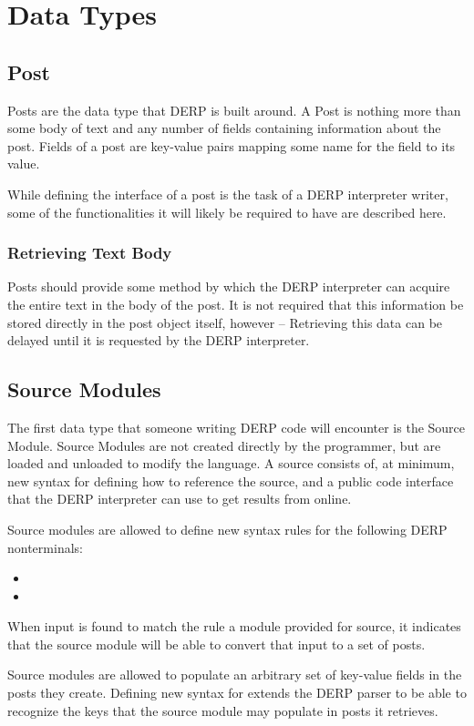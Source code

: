 \section{Data Types}

\subsection{Post}
Posts are the data type that DERP is built around. A Post is nothing more than some body
of text and any number of fields containing information about the post. Fields of a post
are key-value pairs mapping some name for the field to its value.

While defining the interface of a post is the task of a DERP interpreter writer, some of
the functionalities it will likely be required to have are described here.

\subsubsection{Retrieving Text Body}
Posts should provide some method by which the DERP interpreter can acquire the entire
text in the body of the post. It is not required that this information be stored directly
in the post object itself, however -- Retrieving this data can be delayed until it is
requested by the DERP interpreter.

\subsection{Source Modules}\label{sourcemodules}
The first data type that someone writing DERP code will encounter is the Source Module.
Source Modules are not created directly by the programmer, but are loaded and unloaded to
modify the language. A source consists of, at minimum, new syntax for defining how to
reference the source, and a public code interface that the DERP interpreter can use to
get results from online.

Source modules are allowed to define new syntax rules for the following DERP nonterminals:
\begin{itemize}
\item {}
\item {}
\end{itemize}
When input is found to match the rule a module provided for source, it indicates that the
source module will be able to convert that input to a set of posts.

Source modules are allowed to populate an arbitrary set of key-value fields in the posts
they create. Defining new syntax for  extends the DERP parser to be able to recognize
the keys that the source module may populate in posts it retrieves.

